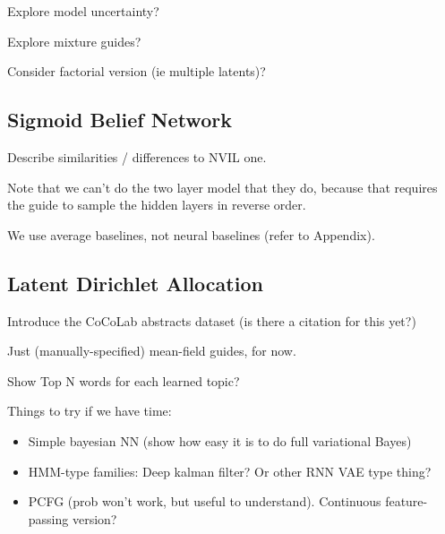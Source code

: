 Explore model uncertainty?

Explore mixture guides?

Consider factorial version (ie multiple latents)?


\subsection{Sigmoid Belief Network}
\label{sec:results_sbn}

Describe similarities / differences to NVIL one.

Note that we can't do the two layer model that they do, because that requires the guide to sample the hidden layers in reverse order.

We use average baselines, not neural baselines (refer to Appendix).


\subsection{Latent Dirichlet Allocation}
\label{sec:results_lda}

Introduce the CoCoLab abstracts dataset (is there a citation for this yet?)

Just (manually-specified) mean-field guides, for now.

Show Top N words for each learned topic?


Things to try if we have time:
\begin{itemize}
\item{Simple bayesian NN (show how easy it is to do full variational Bayes)}
\item{HMM-type families: Deep kalman filter? Or other RNN VAE type thing?}
\item{PCFG (prob won’t work, but useful to understand). Continuous feature-passing version?}
\end{itemize}


